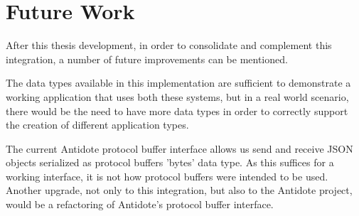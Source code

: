 \section{Future Work}
\label{sec:future_work}
After this thesis development, in order to consolidate and complement this integration, a number of future improvements can be mentioned.\par
	The data types available in this implementation are sufficient to demonstrate a working application that uses both these systems, but in a real world scenario, there would be the need to have more data types in order to correctly support the creation of different application types.\par
	The current Antidote protocol buffer interface allows us send and receive JSON objects serialized as protocol buffers 'bytes' data type. As this suffices for a working interface, it is not how protocol buffers were intended to be used. Another upgrade, not only to this integration, but also to the Antidote project, would be a refactoring of Antidote's protocol buffer interface.